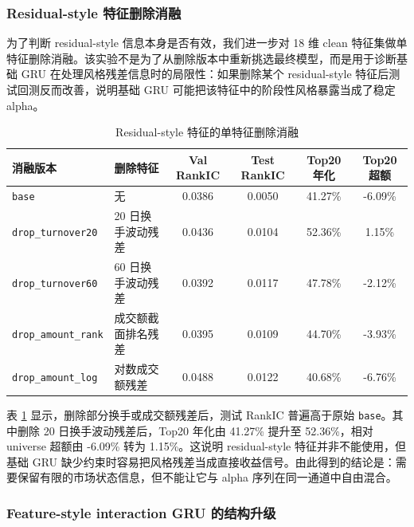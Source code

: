 \documentclass[12pt,a4paper,cn,bibtex]{elegantpaper}
\newcommand{\modelname}[1]{\nolinkurl{#1}}
\begin{document}
\subsubsection{Residual-style 特征删除消融}

为了判断 residual-style 信息本身是否有效，我们进一步对 18 维 clean 特征集做单特征删除消融。该实验不是为了从删除版本中重新挑选最终模型，而是用于诊断基础 GRU 在处理风格残差信息时的局限性：如果删除某个 residual-style 特征后测试回测反而改善，说明基础 GRU 可能把该特征中的阶段性风格暴露当成了稳定 alpha。

\begin{table}[H]
    \centering
    \scriptsize
    \setlength{\tabcolsep}{2pt}
    \begin{tabular}{p{}p{}cccc}
        \toprule
        \textbf{消融版本} & \textbf{删除特征} & \textbf{Val RankIC} & \textbf{Test RankIC} & \textbf{Top20 年化} & \textbf{Top20 超额} \\
        \midrule
        \modelname{base} & 无 & 0.0386 & 0.0050 & 41.27\% & -6.09\% \\
        \modelname{drop\_turnover20} & 20 日换手波动残差 & 0.0436 & 0.0104 & 52.36\% & 1.15\% \\
        \modelname{drop\_turnover60} & 60 日换手波动残差 & 0.0392 & 0.0117 & 47.78\% & -2.12\% \\
        \modelname{drop\_amount\_rank} & 成交额截面排名残差 & 0.0395 & 0.0109 & 44.70\% & -3.93\% \\
        \modelname{drop\_amount\_log} & 对数成交额残差 & 0.0488 & 0.0122 & 40.68\% & -6.76\% \\
        \bottomrule
    \end{tabular}
    \caption{Residual-style 特征的单特征删除消融}
    \label{tab:gru-resid-ablation}
\end{table}

表 \ref{tab:gru-resid-ablation} 显示，删除部分换手或成交额残差后，测试 RankIC 普遍高于原始 \modelname{base}。其中删除 20 日换手波动残差后，Top20 年化由 41.27\% 提升至 52.36\%，相对 universe 超额由 -6.09\% 转为 1.15\%。这说明 residual-style 特征并非不能使用，但基础 GRU 缺少约束时容易把风格残差当成直接收益信号。由此得到的结论是：需要保留有限的市场状态信息，但不能让它与 alpha 序列在同一通道中自由混合。

\subsubsection{Feature-style interaction GRU 的结构升级}
\end{document}
